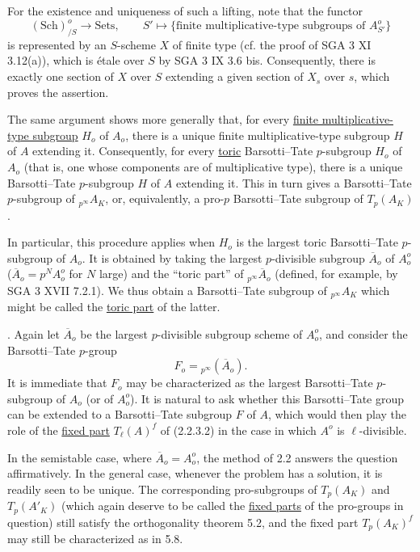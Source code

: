 For the existence and uniqueness of such a lifting, note that the
functor
\[
 (\mathrm{Sch})^o_{/S}\longrightarrow\mathrm{Sets},
 \qquad
 S'\longmapsto
 \{\text{finite multiplicative-type subgroups of }A^o_{S'}\}
\]
is represented by an $S$-scheme $X$ of finite type (cf. the proof of
SGA 3 XI 3.12(a)), which is \'etale over $S$ by SGA 3 IX 3.6 bis.
Consequently, there is exactly one section of $X$ over $S$ extending a
given section of $X_s$ over $s$, which proves the assertion.

The same argument shows more generally that, for every
\underline{finite multiplicative-type subgroup} $H_o$ of $A_o$, there
is a unique finite multiplicative-type subgroup $H$ of $A$ extending
it.  Consequently, for every \underline{toric} Barsotti--Tate
$p$-subgroup $H_o$ of $A_o$ (that is, one whose components are of
multiplicative type), there is a unique Barsotti--Tate $p$-subgroup $H$
of $A$ extending it.  This in turn gives a Barsotti--Tate $p$-subgroup
of ${}_{p^\infty}A_K$, or, equivalently, a pro-$p$ Barsotti--Tate
subgroup of $T_p(A_K)$.

In particular, this procedure applies when $H_o$ is the largest toric
Barsotti--Tate $p$-subgroup of $A_o$.  It is obtained by taking the
largest $p$-divisible subgroup $\overline A_o$ of $A_o^o$
($\overline A_o=p^N A_o^o$ for $N$ large) and the ``toric part'' of
${}_{p^\infty}\overline A_o$ (defined, for example, by SGA 3 XVII
7.2.1).  We thus obtain a Barsotti--Tate subgroup of
${}_{p^\infty}A_K$ which might be called the \underline{toric part} of
the latter.

\medskip
{}. Again let $\overline A_o$ be the largest $p$-divisible subgroup
scheme of $A_o^o$, and consider the Barsotti--Tate $p$-group
\[
 F_o={}_{p^\infty}(\overline A_o).
\]
It is immediate that $F_o$ may be characterized as the largest
Barsotti--Tate $p$-subgroup of $A_o$ (or of $A_o^o$).  It is natural to
ask whether this Barsotti--Tate group can be extended to a
Barsotti--Tate subgroup $F$ of $A$, which would then play the role of
the \underline{fixed part} $T_\ell(A)^f$ of (2.2.3.2) in the case in
which $A^o$ is $\ell$-divisible.

In the semistable case, where $\overline A_o=A_o^o$, the method of 2.2
answers the question affirmatively.  In the general case, whenever the
problem has a solution, it is readily seen to be unique.  The
corresponding pro-subgroups of $T_p(A_K)$ and $T_p(A'_K)$ (which again
deserve to be called the \underline{fixed parts} of the pro-groups in
question) still satisfy the orthogonality theorem 5.2, and the fixed
part $T_p(A_K)^f$ may still be characterized as in 5.8.

